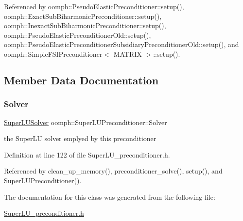 Referenced by oomph\+::\+Pseudo\+Elastic\+Preconditioner\+::setup(), oomph\+::\+Exact\+Sub\+Biharmonic\+Preconditioner\+::setup(), oomph\+::\+Inexact\+Sub\+Biharmonic\+Preconditioner\+::setup(), oomph\+::\+Pseudo\+Elastic\+Preconditioner\+Old\+::setup(), oomph\+::\+Pseudo\+Elastic\+Preconditioner\+Subsidiary\+Preconditioner\+Old\+::setup(), and oomph\+::\+Simple\+F\+S\+I\+Preconditioner$<$ M\+A\+T\+R\+I\+X $>$\+::setup().



\subsection{Member Data Documentation}
\mbox{\label{classoomph_1_1SuperLUPreconditioner_a4da1fff0fd1a2a57d5dfe66e591cf19a}} 
\subsubsection{\texorpdfstring{Solver}{Solver}}
{\footnotesize\ttfamily \hyperlink{classoomph_1_1SuperLUSolver}{Super\+L\+U\+Solver} oomph\+::\+Super\+L\+U\+Preconditioner\+::\+Solver\hspace{0.3cm}{\ttfamily [private]}}



the Super\+LU solver emplyed by this preconditioner 



Definition at line 122 of file Super\+L\+U\+\_\+preconditioner.\+h.



Referenced by clean\+\_\+up\+\_\+memory(), preconditioner\+\_\+solve(), setup(), and Super\+L\+U\+Preconditioner().



The documentation for this class was generated from the following file\+:\begin{DoxyCompactItemize}
\item 
\hyperlink{SuperLU__preconditioner_8h}{Super\+L\+U\+\_\+preconditioner.\+h}\end{DoxyCompactItemize}
